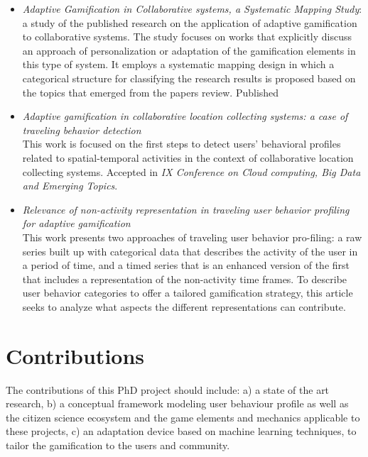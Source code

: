 \documentclass[sigconf]{acmart}
\begin{document}
\begin{itemize}
	\item \textit{Adaptive Gamification in Collaborative systems, a Systematic Mapping Study}:  a study of the published research on the application of adaptive gamification to collaborative systems. The study  focuses  on  works  that  explicitly  discuss  an approach  of personalization or adaptation of the gamification elements in this type of system.  It employs a systematic mapping design in which a categorical structure for classifying the research results is proposed based on the topics that emerged from the papers review.  Published \cite{ayastuy_adaptive_2021}
	\item \textit{Adaptive gamification in collaborative location collecting systems: a case of traveling behavior detection}\\ This work is focused on the first steps to detect users’ behavioral profiles related to spatial-temporal activities in the context of collaborative location collecting systems. Accepted in \textit{IX Conference on Cloud computing, Big Data and Emerging Topics}.
	
	\item \textit{Relevance of non-activity representation in traveling user behavior profiling for adaptive gamification}\\ This work presents two approaches of traveling user behavior pro-filing: a raw series built up with categorical data that describes the activity of the user in a period of time, and a timed series that is an enhanced version of the first that includes a representation of the non-activity time frames. To describe user behavior categories to offer a tailored gamification strategy, this article seeks to analyze what aspects the different representations can contribute. 
\end{itemize}


\section{Contributions}

The contributions of this PhD project should include: a) a state of the art research, b) a conceptual framework modeling user behaviour profile as well as the citizen science ecosystem and the game elements and mechanics applicable to these projects, c) an adaptation device based on machine learning techniques, to tailor the gamification to the users and community. 





\end{document}
